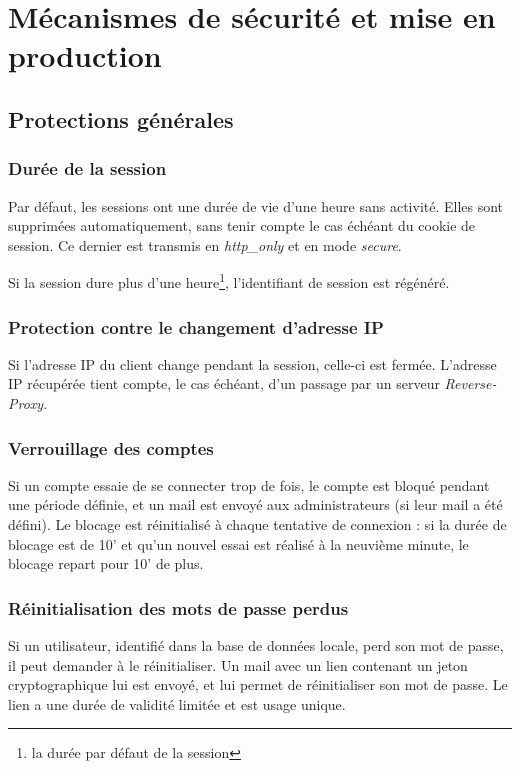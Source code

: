 \chapter{Mécanismes de sécurité et mise en production}

\section{Protections générales}
\subsection{Durée de la session}
Par défaut, les sessions ont une durée de vie d'une heure sans activité. Elles sont supprimées automatiquement, sans tenir compte le cas échéant du cookie de session. Ce dernier est transmis en \textit{http\_only} et en mode \textit{secure}.

Si la session dure plus d'une heure\footnote{la durée par défaut de la session}, l'identifiant de session est régénéré.

\subsection{Protection contre le changement d'adresse IP}

Si l'adresse IP du client change pendant la session, celle-ci est fermée. L'adresse IP récupérée tient compte, le cas échéant, d'un passage par un serveur \textit{Reverse-Proxy}.

\subsection{Verrouillage des comptes}
Si un compte essaie de se connecter trop de fois, le compte est bloqué pendant une période définie, et un mail est envoyé aux administrateurs (si leur mail a été défini).
Le blocage est réinitialisé à chaque tentative de connexion : si la durée de blocage est de 10' et qu'un nouvel essai est réalisé à la neuvième minute, le blocage repart pour 10' de plus.

\subsection{Réinitialisation des mots de passe perdus}
Si un utilisateur, identifié dans la base de données locale, perd son mot de passe, il peut demander à le réinitialiser. Un mail avec un lien contenant un jeton cryptographique lui est envoyé, et lui permet de réinitialiser son mot de passe. Le lien a une durée de validité limitée et est  usage unique.

